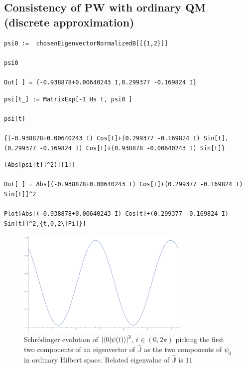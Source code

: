 \subsection{Consistency of PW with ordinary QM (discrete approximation)}

\begin{lstlisting}
psi0 :=  chosenEigenvectorNormalizedB[[{1,2}]]

psi0

Out[ ] = {-0.938878+0.00640243 I,0.299377 -0.169824 I}
\end{lstlisting}

\begin{lstlisting}
psi[t_] := MatrixExp[-I Hs t, psi0 ]

psi[t]

{(-0.938878+0.00640243 I) Cos[t]+(0.299377 -0.169824 I) Sin[t],(0.299377 -0.169824 I) Cos[t]+(0.938878 -0.00640243 I) Sin[t]}
\end{lstlisting}

\begin{lstlisting}
(Abs[psi[t]]^2)[[1]]

Out[ ] = Abs[(-0.938878+0.00640243 I) Cos[t]+(0.299377 -0.169824 I) Sin[t]]^2

Plot[Abs[(-0.938878+0.00640243 I) Cos[t]+(0.299377 -0.169824 I) Sin[t]]^2,{t,0,2\[Pi]}]
\end{lstlisting}
\begin{figure}
  \centering
  \includegraphics[width=0.75\textwidth]{img/probB_0.png}
  \caption[(from notebook)]{
    Schr{\"o}dinger evolution of
    $\qty|\braket{0}{\psi(t)}|^2$, $t \in (0, 2\pi) $
    picking the first two components of an eigenvector of $\hat{\mathbb{J}}$
    as the two components of $\psi_0$ in ordinary Hilbert space.
    Related eigenvalue of $\hat{\mathbb{J}}$ is $11$
  }
\end{figure}

